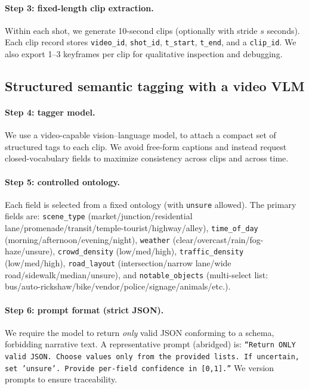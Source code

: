 \paragraph{Step 3: fixed-length clip extraction.} Within each shot, we generate 10-second clips (optionally with stride $s$ seconds). Each clip record stores \texttt{video\_id}, \texttt{shot\_id}, \texttt{t\_start}, \texttt{t\_end}, and a \texttt{clip\_id}. We also export 1--3 keyframes per clip for qualitative inspection and debugging.

\subsection{Structured semantic tagging with a video VLM}\label{sec:vlm_tagging}
\paragraph{Step 4: tagger model.} We use a video-capable vision--language model, to attach a compact set of structured tags to each clip. We avoid free-form captions and instead request closed-vocabulary fields to maximize consistency across clips and across time.
\paragraph{Step 5: controlled ontology.} Each field is selected from a fixed ontology (with \texttt{unsure} allowed). The primary fields are: \texttt{scene\_type} (market/junction/residential lane/promenade/transit/temple-tourist/highway/alley), \texttt{time\_of\_day} (morning/afternoon/evening/night), \texttt{weather} (clear/overcast/rain/fog-haze/unsure), \texttt{crowd\_density} (low/med/high), \texttt{traffic\_density} (low/med/high), \texttt{road\_layout} (intersection/narrow lane/wide road/sidewalk/median/unsure), and \texttt{notable\_objects} (multi-select list: bus/auto-rickshaw/bike/vendor/police/signage/animals/etc.).
\paragraph{Step 6: prompt format (strict JSON).} We require the model to return \emph{only} valid JSON conforming to a schema, forbidding narrative text. A representative prompt (abridged) is: \texttt{``Return ONLY valid JSON. Choose values only from the provided lists. If uncertain, set 'unsure'. Provide per-field confidence in [0,1].''} We version prompts to ensure traceability.

